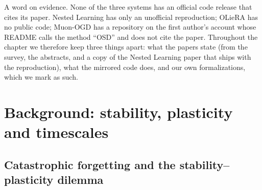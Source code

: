 A word on evidence. None of the three systems has an official code release that cites its
paper. Nested Learning has only an unofficial reproduction; OLieRA has no public code; Muon-OGD
has a repository on the first author's account whose README calls the method ``OSD'' and does
not cite the paper. Throughout the chapter we therefore keep three things apart: what the papers
state (from the survey, the abstracts, and a copy of the Nested Learning paper that ships with
the reproduction), what the mirrored code does, and our own formalizations, which we mark as
such.

\section{Background: stability, plasticity and timescales}\label{sec:c11-background}

\subsection{Catastrophic forgetting and the stability--plasticity dilemma}\label{sec:c11-forgetting}

